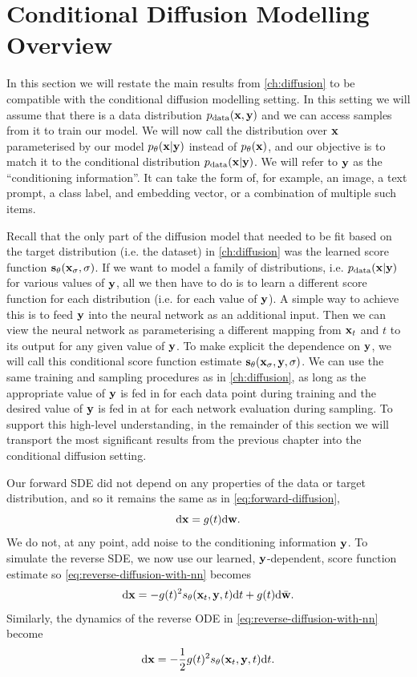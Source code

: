 \section{Conditional Diffusion Modelling Overview} \label{sec:conditional-diffusion-overview}

In this section we will restate the main results from \cref{ch:diffusion} to be compatible with the conditional diffusion modelling setting. In this setting we will assume that there is a data distribution $p_\text{data}({\mathbf{x}}, {\mathbf{y}})$ and we can access samples from it to train our model. We will now call the distribution over ${\mathbf{x}}$ parameterised by our model $p_\theta({\mathbf{x}}|{\mathbf{y}})$ instead of $p_\theta({\mathbf{x}})$, and our objective is to match it to the conditional distribution $p_\text{data}({\mathbf{x}}|{\mathbf{y}})$. We will refer to ${\mathbf{y}}$ as the ``conditioning information''. It can take the form of, for example, an image, a text prompt, a class label, and embedding vector, or a combination of multiple such items.

Recall that the only part of the diffusion model that needed to be fit based on the target distribution (i.e. the dataset) in \cref{ch:diffusion} was the learned score function ${\mathbf{s}}_\theta({\mathbf{x}}_\sigma, \sigma)$. If we want to model a family of distributions, i.e. $p_\text{data}({\mathbf{x}}|{\mathbf{y}})$ for various values of ${\mathbf{y}}$, all we then have to do is to learn a different score function for each distribution (i.e. for each value of ${\mathbf{y}}$). A simple way to achieve this is to feed ${\mathbf{y}}$ into the neural network as an additional input. Then we can view the neural network as parameterising a different mapping from ${\mathbf{x}}_t$ and $t$ to its output for any given value of ${\mathbf{y}}$. To make explicit the dependence on ${\mathbf{y}}$, we will call this conditional score function estimate ${\mathbf{s}}_\theta({\mathbf{x}}_\sigma, {\mathbf{y}}, \sigma)$. We can use the same training and sampling procedures as in \cref{ch:diffusion}, as long as the appropriate value of ${\mathbf{y}}$ is fed in for each data point during training and the desired value of ${\mathbf{y}}$ is fed in at for each network evaluation during sampling. To support this high-level understanding, in the remainder of this section we will transport the most significant results from the previous chapter into the conditional diffusion setting.

Our forward SDE did not depend on any properties of the data or target distribution, and so it remains the same as in \cref{eq:forward-diffusion},
\begin{equation}
    \mathrm{d}{\mathbf{x}} = g(t) \mathrm{d}{\mathbf{w}}.
\end{equation}
We do not, at any point, add noise to the conditioning information ${\mathbf{y}}$. To simulate the reverse SDE, we now use our learned, ${\mathbf{y}}$-dependent, score function estimate so \cref{eq:reverse-diffusion-with-nn} becomes
\begin{align}
    \mathrm{d}{\mathbf{x}} = -g(t)^2 s_\theta({\mathbf{x}}_t, {\mathbf{y}}, t) \mathrm{d}t + g(t) \mathrm{d}\bar{{\mathbf{w}}}.
\end{align}
Similarly, the dynamics of the reverse ODE in \cref{eq:reverse-diffusion-with-nn} become
\begin{align}
    \mathrm{d}{\mathbf{x}} = - \frac{1}{2} g(t)^2 s_\theta({\mathbf{x}}_t, {\mathbf{y}}, t) \mathrm{d}t.
\end{align}

